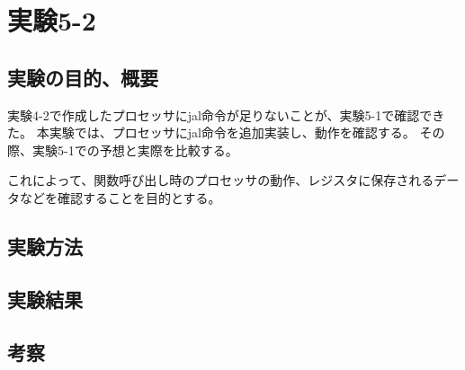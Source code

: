 \section{実験5-2}
\subsection{実験の目的、概要}
実験4-2で作成したプロセッサにjal命令が足りないことが、実験5-1で確認できた。
本実験では、プロセッサにjal命令を追加実装し、動作を確認する。
その際、実験5-1での予想と実際を比較する。

これによって、関数呼び出し時のプロセッサの動作、レジスタに保存されるデータなどを確認することを目的とする。

\subsection{実験方法}

\subsection{実験結果}

\subsection{考察}
